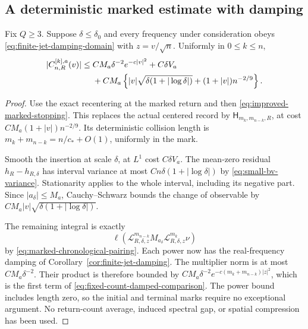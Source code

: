 \subsection{A deterministic marked estimate with damping}
\begin{lemma}
\label{lem:fixed-count-damped-comparison}
Fix $Q\ge3$. Suppose $\delta\le\delta_0$ and every frequency under
consideration obeys \eqref{eq:finite-jet-damping-domain} with
$z=v/\sqrt n$. Uniformly in $0\le k\le n$,
\begin{align}
 |C^{[k],a}_{n,R}(v)|
 \le {}& CM_a\delta^{-2}e^{-c|v|^2}+C\delta V_a\notag\\
 &+CM_a\left\{|v|\sqrt{\delta(1+|\log\delta|)}
              +(1+|v|)n^{-2/9}\right\}.
 \label{eq:fixed-count-damped-comparison}
\end{align}
\end{lemma}
\begin{proof}
Use the exact recentering at the marked return and then
\eqref{eq:improved-marked-stopping}. This replaces the actual centered
record by $\mathsf H_{m_k,m_{n-k},R}$, at cost
$CM_a(1+|v|)n^{-2/9}$. Its deterministic collision length is
$m_k+m_{n-k}=n/c_*+O(1)$, uniformly in the mark.

Smooth the insertion at scale $\delta$, at $L^1$ cost $C\delta V_a$.
The mean-zero residual $h_R-h_{R,\delta}$ has interval variance at
most $Cn\delta(1+|\log\delta|)$ by
\eqref{eq:small-bv-variance}. Stationarity applies to the whole
interval, including its negative part. Since $|a_\delta|\le M_a$,
Cauchy--Schwarz bounds the change of observable by
$CM_a|v|\sqrt{\delta(1+|\log\delta|)}$.

The remaining integral is exactly
\[
 \ell\left(\mathcal L_{R,\delta,z}^{m_{n-k}}
          M_{a_\delta}\mathcal L_{R,\delta,z}^{m_k}\nu\right)
\]
by \eqref{eq:marked-chronological-pairing}. Each power now has the
real-frequency damping of Corollary~\ref{cor:finite-jet-damping}.
The multiplier norm is at most $CM_a\delta^{-2}$. Their product is
therefore bounded by
$CM_a\delta^{-2}e^{-c(m_k+m_{n-k})|z|^2}$, which is the first term
of \eqref{eq:fixed-count-damped-comparison}. The power bound includes
length zero, so the initial and terminal marks require no exceptional
argument. No return-count average, induced spectral gap, or spatial
compression has been used.
\end{proof}

